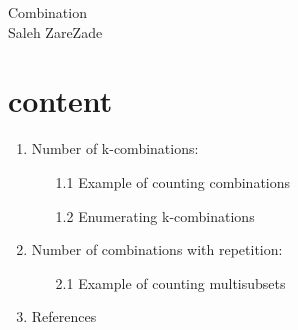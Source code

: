 \documentclass[12pt]{article}
\begin{document}
\begin{center}
{\Huge Combination}\\
\vspace{3mm}
{\large Saleh ZareZade}
\end{center}
\section*{content}
\begin{enumerate}
\item{Number of k-combinations:
\begin{itemize}
\item[1.1]{Example of counting combinations}
\item[1.2]{Enumerating k-combinations}
\end{itemize}
}
\item{Number of combinations with repetition:
\begin{itemize}
\item[2.1]{Example of counting multisubsets}
\end{itemize}
}
\item{References}
\end{enumerate}
\end{document}

